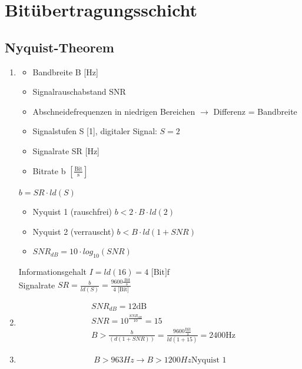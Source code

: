 \section{Bitübertragungsschicht}
\subsection{Nyquist-Theorem}
\begin{enumerate}
	\item 
	\begin{itemize}
		\item Bandbreite B [Hz]
		\item Signalrauschabstand SNR
		\item Abschneidefrequenzen in niedrigen Bereichen \(\to\) Differenz = Bandbreite
		\item Signalstufen S [1], digitaler Signal: \(S = 2\)
		\item Signalrate SR [Hz]
		\item Bitrate b \([\frac{\text{Bit}}{\text{s}}]\)
	\end{itemize}
	\(b = SR \cdot ld(S)\)
	\begin{itemize}
		\item Nyquist 1 (rauschfrei) \(b < 2\cdot B\cdot ld(2)\)
		\item Nyquist 2 (verrauscht) \(b < B \cdot ld(1+SNR) \)
		\item \(SNR_{dB} = 10 \cdot log_{10}(SNR)\)
	\end{itemize}
	Informationsgehalt \(I = ld(16) = 4 \text{ [Bit]f}\)\\
	Signalrate \(SR = \frac{b}{ld(S)} = \frac{9600 \frac{\text{ Bit}}{\text{s}}}{4 \text{ [Bit]}} \)
	\item
	\begin{align*}
	&SNR_{dB} = 12 \text{dB} \\ &SNR = 10^{\frac{SNR_{dB}}{10}} = 15 \\ &B > \frac{b}{(d(1+SNR))} = \frac{9600\frac{\text{Bit}}{\text{s}}}{ld(1+15)} = 2400 \text{Hz}
	\end{align*}
	\item 
	\begin{displaymath}
		B > 963 Hz \to B > 1200 Hz \text{Nyquist 1}
	\end{displaymath}
\end{enumerate}

